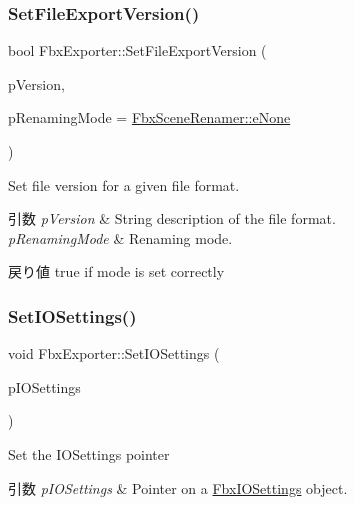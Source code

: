 \subsubsection{\texorpdfstring{Set\+File\+Export\+Version()}{SetFileExportVersion()}}
{\footnotesize\ttfamily bool Fbx\+Exporter\+::\+Set\+File\+Export\+Version (\begin{DoxyParamCaption}\item[{\hyperlink{class_fbx_string}{Fbx\+String}}]{p\+Version,  }\item[{\hyperlink{class_fbx_scene_renamer_a9279ee1a645d6499b934adbc376f8678}{Fbx\+Scene\+Renamer\+::\+E\+Renaming\+Mode}}]{p\+Renaming\+Mode = {\ttfamily \hyperlink{class_fbx_scene_renamer_a9279ee1a645d6499b934adbc376f8678a6530ea605d82bb5be39517b65b47048e}{Fbx\+Scene\+Renamer\+::e\+None}} }\end{DoxyParamCaption})}

Set file version for a given file format. 
\begin{DoxyParams}{引数}
{\em p\+Version} & String description of the file format. \\
\hline
{\em p\+Renaming\+Mode} & Renaming mode. \\
\hline
\end{DoxyParams}
\begin{DoxyReturn}{戻り値}
{\ttfamily true} if mode is set correctly 
\end{DoxyReturn}
\mbox{\label{class_fbx_exporter_a072f9f312b878c796463bf9f9a2e43e0}} 
\subsubsection{\texorpdfstring{Set\+I\+O\+Settings()}{SetIOSettings()}}
{\footnotesize\ttfamily void Fbx\+Exporter\+::\+Set\+I\+O\+Settings (\begin{DoxyParamCaption}\item[{\hyperlink{class_fbx_i_o_settings}{Fbx\+I\+O\+Settings} $\ast$}]{p\+I\+O\+Settings }\end{DoxyParamCaption})}

Set the I\+O\+Settings pointer 
\begin{DoxyParams}{引数}
{\em p\+I\+O\+Settings} & Pointer on a \hyperlink{class_fbx_i_o_settings}{Fbx\+I\+O\+Settings} object. \\
\hline
\end{DoxyParams}
\mbox{\label{class_fbx_exporter_a1684b8488befbd05433963007bbaf3ad}} 
